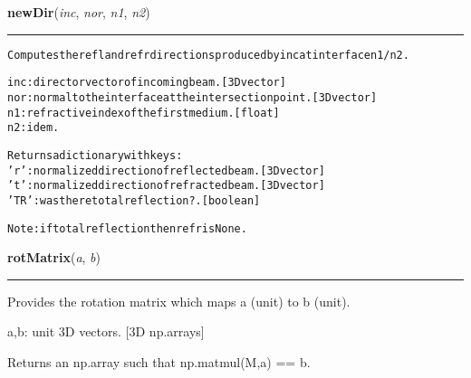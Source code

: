 \hspace{.8\funcindent}\begin{boxedminipage}{\funcwidth}

    \raggedright \textbf{newDir}(\textit{inc}, \textit{nor}, \textit{n1}, \textit{n2})

    \vspace{-1.5ex}

    \rule{\textwidth}{0.5\fboxrule}
\setlength{\parskip}{2ex}
\begin{alltt}
Computes the refl and refr directions produced by inc at interface n1/n2.

inc: director vector of incoming beam. [3D vector]
nor: normal to the interface at the intersection point. [3D vector]
n1: refractive index of the first medium. [float]
n2: idem.

Returns a dictionary with keys:
    'r': normalized direction of reflected beam. [3D vector]
    't': normalized direction of refracted beam. [3D vector]
    'TR': was there total reflection?. [boolean]

Note: if total reflection then refr is None.
\end{alltt}

\setlength{\parskip}{1ex}
    \end{boxedminipage}

    \label{theia:helpers:geometry:rotMatrix}

    \vspace{0.5ex}

\hspace{.8\funcindent}\begin{boxedminipage}{\funcwidth}

    \raggedright \textbf{rotMatrix}(\textit{a}, \textit{b})

    \vspace{-1.5ex}

    \rule{\textwidth}{0.5\fboxrule}
\setlength{\parskip}{2ex}
    Provides the rotation matrix which maps a (unit) to b (unit).

    a,b: unit 3D vectors. [3D np.arrays]

    Returns an np.array such that np.matmul(M,a) == b.

\setlength{\parskip}{1ex}
    \end{boxedminipage}

    \label{theia:helpers:geometry:basis}

